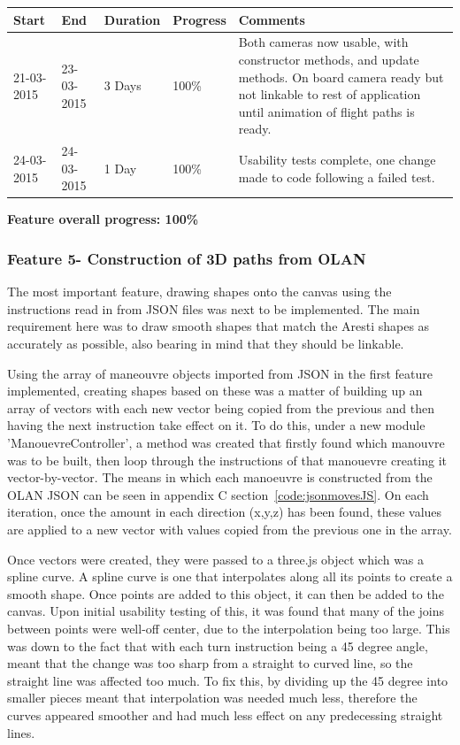 \begin{table}[h]
\begin{tabular}{|l|l|l|l|p{7cm}|}
\hline
\textbf{Start} & \textbf{End} & \textbf{Duration} & \textbf{Progress} & \textbf{Comments}                                                                                                     \\ \hline
21-03-2015     & 23-03-2015   & 3 Days            & 100\%             &  Both cameras now usable, with constructor methods, and update methods. On board camera ready but not linkable to rest of application until animation of flight paths is ready.\\ \hline
24-03-2015     & 24-03-2015   & 1 Day            & 100\%             &  Usability tests complete, one change made to code following a failed test. \\ \hline
\end{tabular}
\end{table}

\textbf{Feature overall progress: 100\%}

\subsubsection{Feature 5- Construction of 3D paths from OLAN}
The most important feature, drawing shapes onto the canvas using the instructions read in from JSON files was next to be implemented. The main requirement here was to draw smooth shapes that match the Aresti shapes as accurately as possible, also bearing in mind that they should be linkable.

Using the array of maneouvre objects imported from JSON in the first feature implemented, creating shapes based on these was a matter of building up an array of vectors with each new vector being copied from the previous and then having the next instruction take effect on it. To do this, under a new module 'ManouevreController', a method was created that firstly found which manouvre was to be built, then loop through the instructions of that manouevre creating it vector-by-vector. The means in which each manoeuvre is constructed from the OLAN JSON can be seen in appendix C section~\ref{code:jsonmovesJS}. On each iteration, once the amount in each direction (x,y,z) has been found, these values are applied to a new vector with values copied from the previous one in the array.

Once vectors were created, they were passed to a three.js object which was a spline curve. A spline curve is one that interpolates along all its points to create a smooth shape. Once points are added to this object, it can then be added to the canvas. Upon initial usability testing of this, it was found that many of the joins between points were well-off center, due to the interpolation being too large. This was down to the fact that with each turn instruction being a 45 degree angle, meant that the change was too sharp from a straight to curved line, so the straight line was affected too much. To fix this, by dividing up the 45 degree into smaller pieces meant that interpolation was needed much less, therefore the curves appeared smoother and had much less effect on any predecessing straight lines.

